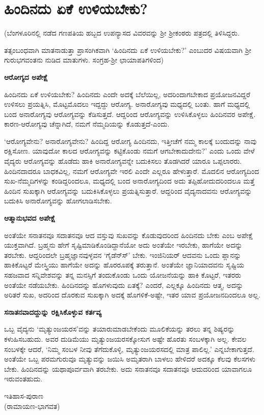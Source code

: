 \chapter{ಹಿಂದಿನದು ಏಕೆ ಉಳಿಯಬೇಕು?} 

(ಬೆಂಗಳೂರಿನಲ್ಲಿ ನಡೆದ ಗಣಪತಿಯ ಹಬ್ಬದ ಉಪನ್ಯಾಸದ ವಿವರವನ್ನು ಶ್ರೀ ಶ್ರೀಕಂಠರು ಪತ್ರದಲ್ಲಿ ತಿಳಿಸಿದ್ದರು. 

ತತ್ಸಂಬಂಧವಾಗಿ ಮಾತನಾಡುತ್ತಾ ಪ್ರಾಸಂಗಿಕವಾಗಿ `ಹಿಂದಿನದು ಏಕೆ ಉಳಿಯಬೇಕು?' ಎಂಬುದರ ವಿಷಯವಾಗಿ ಶ್ರೀ ಗುರುಭಗವಂತನು ನುಡಿದ ಮಾತುಗಳು. ಸಂಗ್ರಹ-ಶ್ರೀ ಛಾಯಾಪತಿಗಳಿಂದ) 

\large{\bf{ಆರೋಗ್ಯದ ಅಪೇಕ್ಷೆ}} 

ಹಿಂದಿನದು ಏಕೆ ಉಳಿಯಬೇಕು? ಹಿಂದಿನದು ಎಂದೇ ಅದಕ್ಕೆ ಬೆಲೆಯಿಲ್ಲ, ಅದರಿಂದಾಗಬೇಕಾದ ಪ್ರಯೋಜನವಿದ್ದರೆ ಉಳಿಸಲು ಪ್ರಯತ್ನಿಸಿ, ಮೊಟ್ಟಮೊದಲು ಇದ್ದದ್ದು ಆರೋಗ್ಯ. ಅನಾರೋಗ್ಯವು ಮಧ್ಯದಲ್ಲಿ ಬಂತು. ಹಾಗೆ ಮಧ್ಯದಲ್ಲಿ ಬಂದ ಅನಾರೋಗ್ಯವು ಆರೋಗ್ಯವನ್ನು ಕೆಡಿಸುತ್ತದೆ. ಆದ್ದರಿಂದ ಆರೋಗ್ಯವನ್ನು ಉಳಿಸಿಕೊಳ್ಳಲು ಹಿಂದಿನವರ ಅಪೇಕ್ಷೆ. ಕಾರಣ-ಆರೋಗ್ಯವು ಚೆನ್ನಾಗಿದೆ, ನಮಗೆ ನೆಮ್ಮದಿಯನ್ನು ಕೊಡುತ್ತದೆ-ಎಂದು. 

`ಆರೋಗ್ಯವೇನು? ಅನಾರೋಗ್ಯವೇನು? ಹಿಂದಿದ್ದ ಆರೋಗ್ಯ ಹಿಂದಿನದು, ಇತ್ತೀಚೆಗೆ ನಮ್ಮ ಕಾಲಕ್ಕೆ ಬಂದುದನ್ನು ನಾವು ರಕ್ಷಿಸೋಣ. ಯಾವುದೋ ಕಾಲದ ಆರೋಗ್ಯವನ್ನು ಕಟ್ಟಿಕೊಂಡು ನಮಗೆ ಆಗಬೇಕಾದುದೇನು?' ಎಂದು ಒಂದು ವೇಳೆ ವೈದ್ಯರು ಆರೋಗ್ಯವನ್ನು ಹೊಡೆದು ಹಾಕಿ ಅನಾರೋಗ್ಯವನ್ನೇ ಬದುಕಿಸಲು ತೊಡಗಿದರೆ ಯಾರೂ ಒಪ್ಪಲಾರರು. ಹಿಂದಿನದಾದರೂ ಬಾಧಕವಿಲ್ಲ, ನಮಗೆ ಆರೋಗ್ಯವೇ ಇರಲಿ ಎಂದೇ ಎಲ್ಲರೂ ಹೇಳುತ್ತಾರೆ. ಮೊದಲಿನ ಆರೋಗ್ಯದಿಂದ ಸುಖ-ನೆಮ್ಮದಿಗಳನ್ನು ಕಂಡಿದ್ದರಿಂದಲೂ, ಮಧ್ಯದಲ್ಲಿ ಬಂದ ಅನಾರೋಗ್ಯದಿಂದ ಅದು ತಪ್ಪಿಹೋದುದರಿಂದಲೂ ಮತ್ತೆ ಹಿಂದಿನ ಸುಖಕ್ಕಾಗಿ ಆರೋಗ್ಯವನ್ನು ಬದುಕಿಸಿಕೊಳ್ಳಲು ಪ್ರಯತ್ನಿಸುತ್ತಾರೆ. ಆದ್ದರಿಂದ ವೈದ್ಯನಾದವನು ಆರೋಗ್ಯವನ್ನು ಬದುಕಿಸಿ ಅನಾರೋಗ್ಯವನ್ನು ಹೋಗಲಾಡಿಸಬೇಕು. 


\large{\bf{ಆತ್ಮಾನುಭವದ ಅಪೇಕ್ಷೆ}} 


ಅಂತೆಯೇ ಸನಾತನವೂ ಸದಾತನವೂ ಆದ ವಸ್ತುವು ಸುಖವನ್ನು ಕೊಡುವುದರಿಂದ ಹಿಂದಿನದು ಬೇಕು ಎಂಬ ಅಪೇಕ್ಷೆ ಯುಕ್ತವಾಗಿದೆ. ಬ್ರಹ್ಮನು ಹೇಗೆ ಸೃಷ್ಟಿಮಾಡಿಕೊಂಡಿದ್ದಾನೆಯೋ ಅದು ಅಂತೆಯೇ ಇರಬೇಕು, ಹಾಗೆಯೇ ಅದನ್ನು ತರಬೇಕು. ಆದ್ದರಿಂದಲೇ ಬ್ರಹ್ಮಜ್ಞಾನವುಳ್ಳವನ `ಗೈಡೆನ್ಸ್‍' ಬೇಕು. ಇಂಜಿನಿಯರ್‍ ಆದವನು ಒಂದು ಪ್ಲಾನನ್ನು ಹಾಕಿಕೊಟ್ಟರೆ ಮೇಸ್ತ್ರಿಯು ಹಾಗೆಯೇ ಅದನ್ನು ಹೊರರೂಪಕ್ಕೆ ತರುತ್ತಾನೆ. ಅಂತೆಯೇ ಜ್ಞಾನಿಯಾದವನು ಸೃಷ್ಟಿಯ ಸಹಜವಾದ ಸನ್ನಿವೇಶವನ್ನು ತನ್ನ ಮನಸ್ಸಿಗೆ ತಂದುಕೊಂಡು ಒಂದು ಯೋಜನೆಯನ್ನು ಹಾಕಿ ಕೊಟ್ಟರೆ, ಇತರರು ಅಂತೆಯೇ ನಡೆಯಬೇಕು. ಹಿಂದಿನದನ್ನು ಹೊಗಳುವುದು ಏತಕ್ಕೆ? ಎಂದರೆ, ಎಲ್ಲಕ್ಕೂ ಹಿಂದಿನದು ಆತ್ಮ, ಅದನ್ನು ಅರಿತರೆ ಸುಖ, ಅದರಿಂದ ದೊರಕುವ ಸುಖಕ್ಕಾಗಿ ಅದಕ್ಕೆ ಹೊಗಳಿಕೆ-ಅಷ್ಟೇ, ಇತರ ಯಾವ ಪ್ರಯೋಜನದಿಂದಲೂ ಅಲ್ಲ. 


\large{\bf{ಸನಾತನವಾದದ್ದುನ್ನು ರಕ್ಷಿಸಿಕೊಳ್ಳುವ ಕರ್ತವ್ಯ}} 


ಒಬ್ಬ ವೈದ್ಯನು `ಮೃತ್ಯುಂಜಯರಸ'ವನ್ನು ತಯಾರುಮಾಡಬೇಕೆಂದು ಮೂಲಿಕೆಯನ್ನು ತರಲು ತನ್ನ ಶಿಷ್ಯರನ್ನು ಕಳುಹಿಸಬಹುದು. ಅವರ ದುಡಿಮೆಯು ಮೃತ್ಯುಂಜಯರಸಕ್ಕೋಸುಗ ಅಷ್ಟೇ ಹೊರತು ಸಂಬಳಕ್ಕಾಗಿ ಅಲ್ಲ. ಕೇವಲ ಸಂಬಳಕ್ಕೇ ಆದರೆ, `ನಿಮ್ಮ ಸಂಬಳ ನೀವು ತೆಗೆದುಕೊಳ್ಳಿ, ಮೃತ್ಯುಂಜಯರಸದಲ್ಲಿ ಮಾತ್ರ ಪಾಲಿಲ್ಲ.' ಎನ್ನಬೇಕಾಗುತ್ತದೆ. ಅಂತೆಯೇ ಒಬ್ಬ ಪರಮಗುರುವೂ ಮೃತ್ಯುವನ್ನು ಜಯಿಸಿ ಅಮೃತರಾಗಿ ಬಾಳಲು ಹೇಳಿದರೆ ಅದಕ್ಕೂ ಕೆಲವು ಕೆಲಸಗಳು ಬೇಕು. ಹಿಂದಿನದನ್ನು ಯಥಾಪೂರ್ವವಾಗಿ ತರಬೇಕು. ಅದು ಸನಾತನವೂ ಸದಾತನವೂ ಆದುದರಿಂದ ಯಾವಾಗಲೂ ಇರುವಂತಹುದು. 


\newpage 

\begin{center} 

{\LARGE ಇತಿಹಾಸ-ಪುರಾಣ}\\ 

{\LARGE (ರಾಮಾಯಣ-ಭಾಗವತ)} 

\end{center} 
